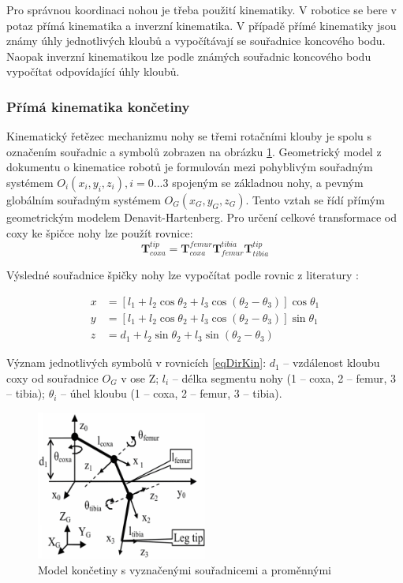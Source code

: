 Pro správnou koordinaci nohou je třeba použití kinematiky. V robotice se bere v potaz přímá kinematika a inverzní kinematika. V případě přímé kinematiky jsou známy úhly jednotlivých kloubů a vypočítávají se souřadnice koncového bodu. Naopak inverzní kinematikou lze podle známých souřadnic koncového bodu vypočítat odpovídající úhly kloubů.

\subsubsection*{Přímá kinematika končetiny}
Kinematický řetězec mechanizmu nohy se třemi rotačními klouby je spolu s označením souřadnic a symbolů zobrazen na obrázku \ref{hexkin}. Geometrický model z dokumentu o kinematice robotů \cite{HexapodKinematics} je formulován mezi pohyblivým souřadným systémem $O_i(x_i, y_i, z_i), i = 0...3$ spojeným se základnou nohy, a pevným globálním souřadným systémem $O_G(x_G, y_G, z_G)$. Tento vztah se řídí přímým geometrickým modelem Denavit-Hartenberg. Pro určení celkové transformace od coxy ke špičce nohy lze použít rovnice:
\begin{equation}
\boldsymbol{T}_{coxa}^{tip}=\boldsymbol{T}_{coxa}^{femur}\boldsymbol{T}_{femur}^{tibia}\boldsymbol{T}_{tibia}^{tip}
\end{equation}



Výsledné souřadnice špičky nohy lze vypočítat podle rovnic z literatury \cite{HexapodKinematics}:

\begin{equation} \label{eqDirKin}
\begin{split}
x & =[l_{1}+l_{2}\cos\theta_{2}+l_{3}\cos(\theta_{2}-\theta_{3})]\cos\theta_{1} \\
y & =[l_{1}+l_{2}\cos\theta_{2}+l_{3}\cos(\theta_{2}-\theta_{3})]\sin\theta_{1} \\
z & =d_{1}+l_{2}\sin\theta_{2}+l_{3}\sin(\theta_{2}-\theta_{3}) 
\end{split}
\end{equation}

Význam jednotlivých symbolů v rovnicích \eqref{eqDirKin}: $d_1$ -- vzdálenost kloubu coxy od souřadnice $O_G$ v ose Z; $l_i$ -- délka segmentu nohy (1 -- coxa, 2 -- femur, 3 -- tibia); $\theta_i$ -- úhel kloubu (1 -- coxa, 2 -- femur, 3 -- tibia).

\begin{figure}[hbt]
	\centering
	\includegraphics[width=0.5\textwidth]{obrazky-figures/hexkinematics.png}
	\caption{Model končetiny s vyznačenými souřadnicemi a proměnnými \cite{HexapodKinematics}}
	\label{hexkin}
\end{figure}

